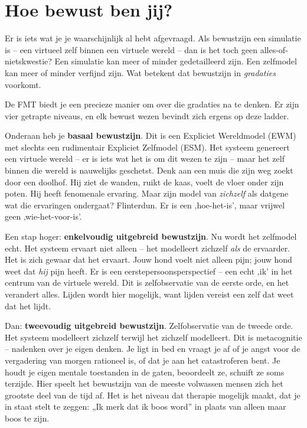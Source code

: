 \documentclass[11pt, twoside, openright]{book}
\begin{document}
\section*{Hoe bewust ben jij?}

Er is iets wat je je waarschijnlijk al hebt afgevraagd. Als bewustzijn een simulatie is -- een virtueel zelf binnen een virtuele wereld -- dan is het toch geen alles-of-nietskwestie? Een simulatie kan meer of minder gedetailleerd zijn. Een zelfmodel kan meer of minder verfijnd zijn. Wat betekent dat bewustzijn in \textit{gradaties} voorkomt.

De FMT biedt je een precieze manier om over die gradaties na te denken. Er zijn vier getrapte niveaus, en elk bewust wezen bevindt zich ergens op deze ladder.

Onderaan heb je \textbf{basaal bewustzijn}. Dit is een Expliciet Wereldmodel (EWM) met slechts een rudimentair Expliciet Zelfmodel (ESM). Het systeem genereert een virtuele wereld -- er is iets wat het is om dit wezen te zijn -- maar het zelf binnen die wereld is nauwelijks geschetst. Denk aan een muis die zijn weg zoekt door een doolhof. Hij ziet de wanden, ruikt de kaas, voelt de vloer onder zijn poten. Hij heeft fenomenale ervaring. Maar zijn model van \textit{zichzelf} als datgene wat die ervaringen ondergaat? Flinterdun. Er is een ‚hoe-het-is', maar vrijwel geen ‚wie-het-voor-is'.

Een stap hoger: \textbf{enkelvoudig uitgebreid bewustzijn}. Nu wordt het zelfmodel echt. Het systeem ervaart niet alleen -- het modelleert zichzelf \textit{als} de ervaarder. Het is zich gewaar dat het ervaart. Jouw hond voelt niet alleen pijn; jouw hond weet dat \textit{hij} pijn heeft. Er is een eerstepersoonsperspectief -- een echt ‚ik' in het centrum van de virtuele wereld. Dit is zelfobservatie van de eerste orde, en het verandert alles. Lijden wordt hier mogelijk, want lijden vereist een zelf dat weet dat het lijdt.

Dan: \textbf{tweevoudig uitgebreid bewustzijn}. Zelfobservatie van de tweede orde. Het systeem modelleert zichzelf terwijl het zichzelf modelleert. Dit is metacognitie -- nadenken over je eigen denken. Je ligt in bed en vraagt je af of je angst voor de vergadering van morgen rationeel is, of dat je aan het catastroferen bent. Je houdt je eigen mentale toestanden in de gaten, beoordeelt ze, schuift ze soms terzijde. Hier speelt het bewustzijn van de meeste volwassen mensen zich het grootste deel van de tijd af. Het is het niveau dat therapie mogelijk maakt, dat je in staat stelt te zeggen: „Ik merk dat ik boos word” in plaats van alleen maar boos te zijn.
\end{document}
